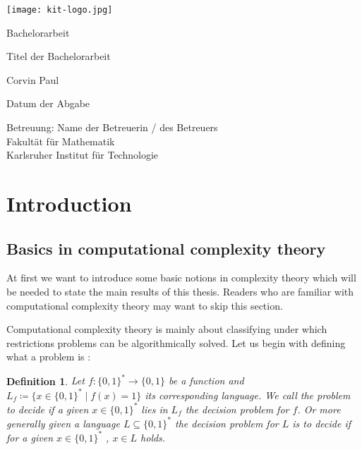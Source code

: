\documentclass[12pt,a4paper]{scrartcl}
\newtheorem{Definition}[Theorem]{Definition}
\numberwithin{equation}{section}
\begin{document}
  \pagestyle{empty}

  \begin{titlepage}

    \texttt{[image: kit-logo.jpg]} 
    \vspace*{2cm} 

 \begin{center} \large 
    
    Bachelorarbeit
    \vspace*{2cm}

    {\huge Titel der Bachelorarbeit}
    \vspace*{2.5cm}

    Corvin Paul
    \vspace*{1.5cm}

    Datum der Abgabe
    \vspace*{4.5cm}


    Betreuung: Name der Betreuerin / des Betreuers \\[1cm]
    Fakultät für Mathematik \\[1cm]
		Karlsruher Institut für Technologie
  \end{center}
\end{titlepage}



  \tableofcontents

\newpage
 


  \pagestyle{headings}

\section{Introduction}

\subsection{Basics in computational complexity theory}
At first we want to introduce some basic notions in complexity theory which will be needed to state the main results of this thesis.
Readers who are familiar with computational complexity theory may want to skip this section.

Computational complexity theory is mainly about classifying under which restrictions problems can be algorithmically solved.
Let us begin with defining what a problem is :

\begin{Definition}
 Let $f \colon {\lbrace 0,1 \rbrace}^* \to {\lbrace 0,1 \rbrace}$ be a function and $L_f \coloneqq {\lbrace 
 x \in {\lbrace 0,1 \rbrace}^*  \; | \; f(x) = 1 \rbrace} $ its corresponding language. We call the 
 problem to decide if a given $x \in {\lbrace 0,1 \rbrace}^*$ lies in $L_f$ the \emph{decision problem} for $f$.
 Or more generally given a language $L \subseteq {\lbrace 0,1 \rbrace}^*$ the decision problem for $L$ is to decide
 if for a given $x \in {\lbrace 0,1 \rbrace}^* $ , $x \in L$ holds.
\end{Definition}
\end{document}

